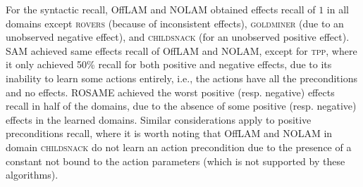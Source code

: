 \documentclass[letterpaper]{article} %
\newcommand{\nolam}{NOLAM\xspace}
\newcommand{\offlam}{OffLAM\xspace}
\newcommand{\rosame}{ROSAME\xspace}
\newcommand{\samshort}{SAM\xspace}
\newif\ifaddcomments
\newcommand{\roni}[1]{\ifaddcomments{\textcolor{red}{[Roni: #1]}}\fi}
\newcommand{\leo}[1]{\ifaddcomments{\textcolor{pink}{[Leonardo: #1]}}\fi}
\begin{document}
%
For the syntactic recall, \offlam and \nolam obtained effects recall of $1$ in all domains except \textsc{rovers} (because of inconsistent effects), \textsc{goldminer} (due to an unobserved negative effect), and \textsc{childsnack} (for an unobserved positive effect). \samshort achieved same effects recall of \offlam{} and \nolam, except for \textsc{tpp}, where it only achieved 50\% recall for both positive and negative effects, due to its inability to learn some actions entirely, i.e., the actions have all the preconditions and no effects. 
\rosame achieved the worst positive (resp. negative) effects recall in half of the domains, due to the absence of some positive (resp. negative) effects in the learned domains.  
Similar considerations apply to positive preconditions recall, where it is worth noting that \offlam and \nolam in domain \textsc{childsnack} do not learn an action precondition due to the presence of a constant not bound to the action parameters (which is not supported by these algorithms). 
\end{document}

